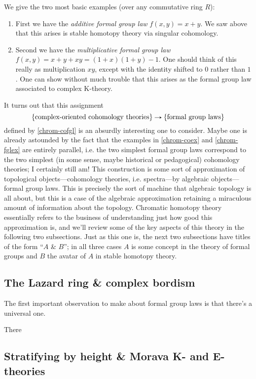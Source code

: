 \begin{examples}
  \label{chrom-fglex}
  We give the two most basic examples (over any commutative ring $R$):
  \begin{enumerate}
  \item First we have the \emph{additive formal group law} $f(x,y) =
    x+y$. We saw above that this arises is stable homotopy theory via
    singular cohomology.
  \item Second we have the \emph{multiplicative formal group law}
    $f(x,y) = x+y+xy = (1+x)(1+y)-1$. One should think of this really
    as multiplication $xy$, except with the identity shifted to $0$
    rather than $1$. One can show without much trouble that this
    arises as the formal group law associated to complex K-theory.
  \end{enumerate}
\end{examples}

It turns out that this assignment
\[
\l\{ \text{complex-oriented cohomology theories} \r\} \to
\l\{ \text{formal group laws} \r\}
\]
defined by \cref{chrom-cofgl} is an absurdly interesting one to
consider. Maybe one is already astounded by the fact that the examples
in \cref{chrom-coex} and \cref{chrom-fglex} are entirely parallel,
i.e. the two simplest formal group laws correspond to the two simplest
(in some sense, maybe historical or pedagogical) cohomology theories;
I certainly still am! This construction is some sort of approximation
of topological objects---cohomology theories, i.e. spectra---by
algebraic objects---formal group laws. This is precisely the sort of
machine that algebraic topology is all about, but this is a case of
the algebraic approximation retaining a miraculous amount of
information about the topology. Chromatic homotopy theory essentially
refers to the business of understanding just how good this
approximation is, and we'll review some of the key aspects of this
theory in the following two subsections. Just as this one is, the next
two subsections have titles of the form ``$A$ \& $B$''; in all three
cases $A$ is some concept in the theory of formal groups and $B$ the
avatar of $A$ in stable homotopy theory.

\subsection{The Lazard ring \& complex bordism}
\label{chrom-lazmu}

The first important observation to make about formal group laws is
that there's a universal one.

\begin{construction}
  \label{chrom-univfgl}
  There 
\end{construction}

\subsection{Stratifying by height \& Morava K- and E-theories}
\label{chrom-strat}